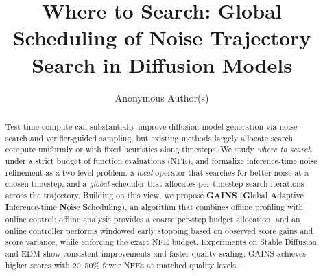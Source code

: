 \documentclass[11pt]{article}
\title{Where to Search: Global Scheduling of Noise Trajectory Search in Diffusion Models}
\author{Anonymous Author(s)}
\date{}
\theoremstyle{plain}
\theoremstyle{definition}
\theoremstyle{remark}
\begin{document}
\maketitle

\begin{abstract}
Test-time compute can substantially improve diffusion model generation via noise search and verifier-guided sampling, but existing methods largely allocate search compute uniformly or with fixed heuristics along timesteps.
We study \emph{where to search} under a strict budget of function evaluations (NFE), and formalize inference-time noise refinement as a two-level problem: a \emph{local} operator that searches for better noise at a chosen timestep, and a \emph{global} scheduler that allocates per-timestep search iterations across the trajectory.
Building on this view, we propose \textbf{GAINS} (\textbf{G}lobal \textbf{A}daptive \textbf{I}nference-time \textbf{N}oise \textbf{S}cheduling), an algorithm that combines offline profiling with online control: offline analysis provides a coarse per-step budget allocation, and an online controller performs windowed early stopping based on observed score gains and score variance, while enforcing the exact NFE budget.
Experiments on Stable Diffusion and EDM show consistent improvements and faster quality scaling: GAINS achieves higher scores with 20--50\% fewer NFEs at matched quality levels.
\end{abstract}










\appendix


\end{document}
